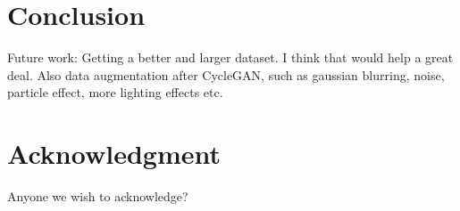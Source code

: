 \section{Conclusion}

Future work: Getting a better and larger dataset. I think that would help a great deal. Also data augmentation
after CycleGAN, such as gaussian blurring, noise, particle effect, more lighting effects etc.

\section*{Acknowledgment}
Anyone we wish to acknowledge?